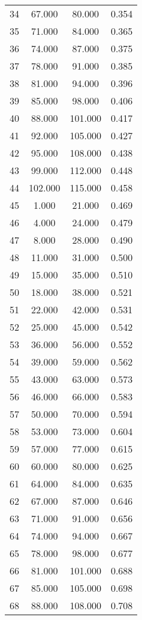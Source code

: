 \begin{tabular}{cccc}
  34 & 67.000 & 80.000 & 0.354 \\ 
  35 & 71.000 & 84.000 & 0.365 \\ 
  36 & 74.000 & 87.000 & 0.375 \\ 
  37 & 78.000 & 91.000 & 0.385 \\ 
  38 & 81.000 & 94.000 & 0.396 \\ 
  39 & 85.000 & 98.000 & 0.406 \\ 
  40 & 88.000 & 101.000 & 0.417 \\ 
  41 & 92.000 & 105.000 & 0.427 \\ 
  42 & 95.000 & 108.000 & 0.438 \\ 
  43 & 99.000 & 112.000 & 0.448 \\ 
  44 & 102.000 & 115.000 & 0.458 \\ 
  45 & 1.000 & 21.000 & 0.469 \\ 
  46 & 4.000 & 24.000 & 0.479 \\ 
  47 & 8.000 & 28.000 & 0.490 \\ 
  48 & 11.000 & 31.000 & 0.500 \\ 
  49 & 15.000 & 35.000 & 0.510 \\ 
  50 & 18.000 & 38.000 & 0.521 \\ 
  51 & 22.000 & 42.000 & 0.531 \\ 
  52 & 25.000 & 45.000 & 0.542 \\ 
  53 & 36.000 & 56.000 & 0.552 \\ 
  54 & 39.000 & 59.000 & 0.562 \\ 
  55 & 43.000 & 63.000 & 0.573 \\ 
  56 & 46.000 & 66.000 & 0.583 \\ 
  57 & 50.000 & 70.000 & 0.594 \\ 
  58 & 53.000 & 73.000 & 0.604 \\ 
  59 & 57.000 & 77.000 & 0.615 \\ 
  60 & 60.000 & 80.000 & 0.625 \\ 
  61 & 64.000 & 84.000 & 0.635 \\ 
  62 & 67.000 & 87.000 & 0.646 \\ 
  63 & 71.000 & 91.000 & 0.656 \\ 
  64 & 74.000 & 94.000 & 0.667 \\ 
  65 & 78.000 & 98.000 & 0.677 \\ 
  66 & 81.000 & 101.000 & 0.688 \\ 
  67 & 85.000 & 105.000 & 0.698 \\ 
  68 & 88.000 & 108.000 & 0.708 \\ 

\end{tabular}
